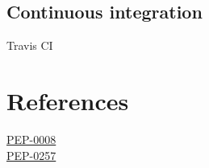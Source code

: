 \documentclass[a4paper]{report}
\begin{document}


\section{Continuous integration}
Travis CI


\chapter*{References}
\href{https://www.python.org/dev/peps/pep-0008/}{PEP-0008}\\
\href{https://www.python.org/dev/peps/pep-0257/}{PEP-0257}

	
\end{document}
